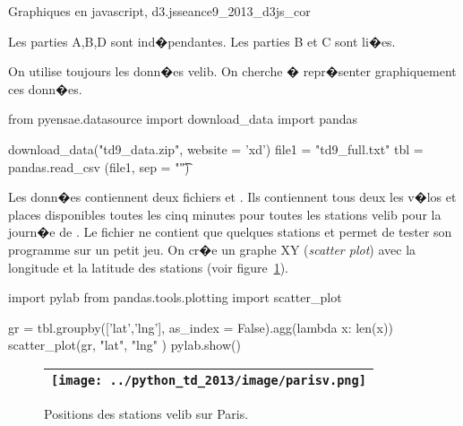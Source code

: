 %




\begin{xtd}{Graphiques en javascript, d3.js}{seance9_2013_d3js_cor}\label{seance9_2013_d3js}




Les parties A,B,D sont ind�pendantes. Les parties B et C sont li�es.



On utilise toujours les donn�es velib. On cherche � repr�senter graphiquement ces donn�es. 

\begin{verbatimx}
from pyensae.datasource import download_data
import pandas

download_data("td9_data.zip", website = 'xd')
file1 = "td9_full.txt"
tbl = pandas.read_csv (file1, sep = "\t")
\end{verbatimx}

Les donn�es contiennent deux fichiers  et . Ils contiennent tous deux les v�los et places disponibles toutes les cinq minutes pour toutes les stations velib pour la journ�e de . Le fichier  ne contient que quelques stations et permet de tester son programme sur un petit jeu. On cr�e un graphe XY (\textit{scatter plot}) avec la longitude et la latitude des stations (voir figure~\ref{td9_parisv}).

\begin{verbatimx}
import pylab
from pandas.tools.plotting import scatter_plot

gr = tbl.groupby(['lat','lng'], as_index = False).agg(lambda x: len(x))
scatter_plot(gr, "lat", "lng" )
pylab.show()
\end{verbatimx}


\begin{figure}[ht]
\begin{center}\begin{tabular}{|c|}\hline 
\texttt{[image: ../python\_td\_2013/image/parisv.png]} \\ \hline
\end{tabular}
\end{center}
\caption{Positions des stations velib sur Paris.}
\label{td9_parisv}
\end{figure}



\end{xtd}
